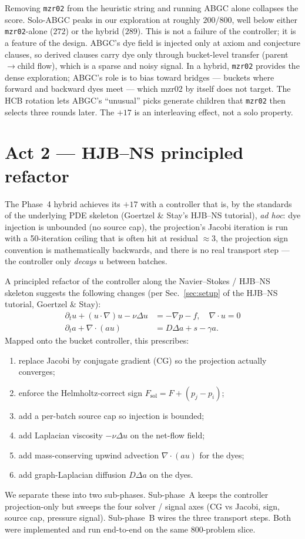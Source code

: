 \documentclass[11pt]{article}
\begin{document}
Removing \texttt{mzr02} from the heuristic string and running ABGC
alone collapses the score. Solo-ABGC peaks in our exploration at roughly
$200$/$800$, well below either \texttt{mzr02}-alone ($272$) or the hybrid
($289$). This is not a failure of the controller; it is a feature of
the design. ABGC's dye field is injected only at axiom and conjecture
clauses, so derived clauses carry dye only through bucket-level transfer
(parent$\to$child flow), which is a sparse and noisy signal. In a hybrid,
\texttt{mzr02} provides the dense exploration; ABGC's role is to bias
toward bridges --- buckets where forward and backward dyes meet --- which
mzr02 by itself does not target. The HCB rotation lets ABGC's
``unusual'' picks generate children that \texttt{mzr02} then selects three
rounds later. The $+17$ is an interleaving effect, not a solo property.

\section{Act 2 --- HJB--NS principled refactor}\label{sec:act2}

The Phase~4 hybrid achieves its $+17$ with a controller that is, by the
standards of the underlying PDE skeleton (Goertzel \& Stay's HJB--NS
tutorial), \emph{ad hoc}: dye injection is unbounded (no source cap),
the projection's Jacobi iteration is run with a 50-iteration ceiling that is
often hit at residual $\approx 3$, the projection sign convention is
mathematically backwards, and there is no real transport step --- the
controller only \emph{decays} $u$ between batches.

A principled refactor of the controller along the Navier--Stokes /
HJB--NS skeleton suggests the following changes (per Sec.~\ref{sec:setup}
of the HJB--NS tutorial, Goertzel \& Stay):
\begin{align}
   \partial_t u + (u\!\cdot\!\nabla)u - \nu \Delta u
       &= -\nabla p - f, \quad \nabla\!\cdot\!u = 0 \\
   \partial_t a + \nabla\!\cdot\!(au)
       &= D \Delta a + s - \gamma a.
\end{align}
Mapped onto the bucket controller, this prescribes:
\begin{enumerate}
\item replace Jacobi by conjugate gradient (CG) so the projection actually converges;
\item enforce the Helmholtz-correct sign $F_\mathrm{sol} = F + (p_j - p_i)$;
\item add a per-batch source cap so injection is bounded;
\item add Laplacian viscosity $-\nu \Delta u$ on the net-flow field;
\item add mass-conserving upwind advection $\nabla\!\cdot\!(au)$ for the dyes;
\item add graph-Laplacian diffusion $D \Delta a$ on the dyes.
\end{enumerate}
We separate these into two sub-phases. Sub-phase~A keeps the controller
projection-only but sweeps the four solver / signal axes (CG vs Jacobi,
sign, source cap, pressure signal). Sub-phase~B wires the three transport
steps. Both were implemented and run end-to-end on the same 800-problem
slice.
\end{document}
